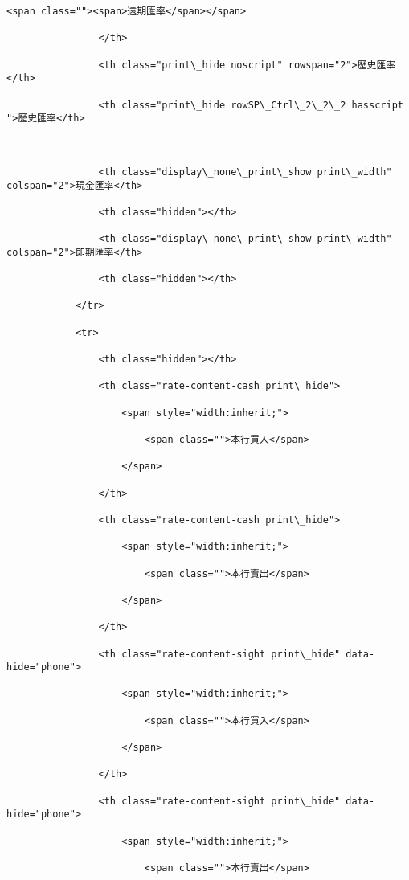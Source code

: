 \documentclass[11pt]{article}
\begin{document}
\begin{Verbatim}[commandchars=\\\{\}]
                    <span class=""><span>遠期匯率</span></span>

                </th>

                <th class="print\_hide noscript" rowspan="2">歷史匯率</th>

                <th class="print\_hide rowSP\_Ctrl\_2\_2\_2 hasscript ">歷史匯率</th>



                <th class="display\_none\_print\_show print\_width" colspan="2">現金匯率</th>

                <th class="hidden"></th>

                <th class="display\_none\_print\_show print\_width" colspan="2">即期匯率</th>

                <th class="hidden"></th>

            </tr>

            <tr>

                <th class="hidden"></th>

                <th class="rate-content-cash print\_hide">

                    <span style="width:inherit;">

                        <span class="">本行買入</span>

                    </span>

                </th>

                <th class="rate-content-cash print\_hide">

                    <span style="width:inherit;">

                        <span class="">本行賣出</span>

                    </span>

                </th>

                <th class="rate-content-sight print\_hide" data-hide="phone">

                    <span style="width:inherit;">

                        <span class="">本行買入</span>

                    </span>

                </th>

                <th class="rate-content-sight print\_hide" data-hide="phone">

                    <span style="width:inherit;">

                        <span class="">本行賣出</span>


\end{Verbatim}
\end{document}
